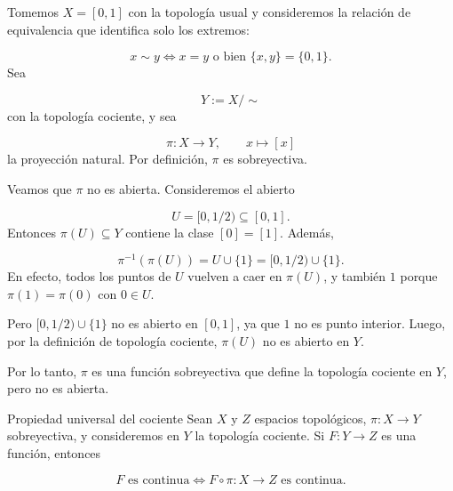 \begin{bookproof}{}
Tomemos $X=[0,1]$ con la topología usual y consideremos la relación de equivalencia que identifica solo los extremos:

\[
x\sim y \iff x=y \text{ o bien } \{x,y\}=\{0,1\}.
\]
Sea

\[
Y:=X/{\sim}
\]
con la topología cociente, y sea

\[
\pi:X\to Y,\qquad x\mapsto [x]
\]
la proyección natural. Por definición, $\pi$ es sobreyectiva.

Veamos que $\pi$ no es abierta. Consideremos el abierto

\[
U=[0,1/2)\subseteq [0,1].
\]
Entonces $\pi(U)\subseteq Y$ contiene la clase $[0]=[1]$. Además,

\[
\pi^{-1}(\pi(U))=U\cup\{1\}=[0,1/2)\cup\{1\}.
\]
En efecto, todos los puntos de $U$ vuelven a caer en $\pi(U)$, y también $1$ porque $\pi(1)=\pi(0)$ con $0\in U$.

Pero $[0,1/2)\cup\{1\}$ no es abierto en $[0,1]$, ya que $1$ no es punto interior. Luego, por la definición de topología cociente, $\pi(U)$ no es abierto en $Y$.

Por lo tanto, $\pi$ es una función sobreyectiva que define la topología cociente en $Y$, pero no es abierta.

\bookqed
\end{bookproof}
\begin{bookexercise}{Propiedad universal del cociente}
Sean $X$ y $Z$ espacios topológicos, $\pi:X\to Y$ sobreyectiva, y consideremos en $Y$ la topología cociente. Si $F:Y\to Z$ es una función, entonces

\[
F \text{ es continua}\iff F\circ \pi:X\to Z \text{ es continua}.
\]
\end{bookexercise}
